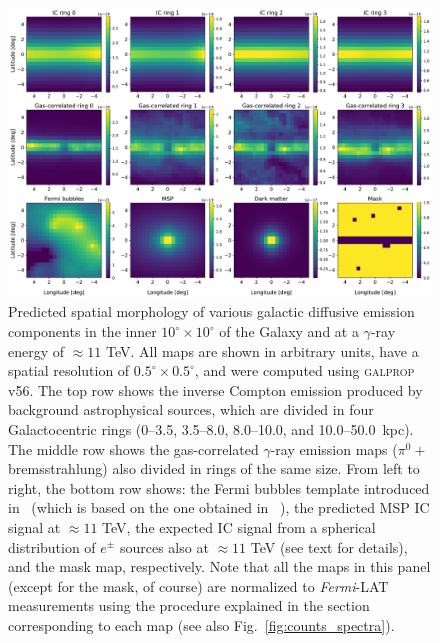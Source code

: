 \documentclass[doublespace,draft,nopageskip]{VTthesis} %
\begin{document}
\begin{figure}
    \begin{center}
    \includegraphics[scale = 0.45]{Figures/CTA/maps_orig.pdf}
    \caption{Predicted spatial morphology of various galactic diffusive emission components in the inner $10^\circ \times 10^\circ$ of the Galaxy and at a $\gamma$-ray energy of $\approx 11$ TeV. All maps  
    are shown in arbitrary units, have a spatial resolution of $0.5^\circ \times 0.5^\circ$, and were computed using \textsc{galprop} v56. The top row shows the inverse Compton emission produced by background astrophysical sources, which are divided in four Galactocentric rings (0--3.5, 3.5--8.0, 8.0--10.0, and 10.0--50.0~kpc). The middle row shows the gas-correlated $\gamma$-ray emission maps ($\pi^0+$bremsstrahlung) also divided in rings of the same size. From left to right, the bottom row shows: the Fermi bubbles template introduced in~\citet{Macias:2019omb} (which is based on the one obtained in ~\citet{Fermi-bubbles:2014sfa}), the predicted MSP IC signal at $\approx 11$ TeV, the expected IC signal from a spherical distribution of $e^{\pm}$ sources also at $\approx 11$ TeV 
    (see text for details), and the mask map, respectively. Note that all the maps in this panel (except for the mask, of course) are normalized to \textit{Fermi}-LAT measurements using the procedure explained in the section corresponding to each map (see also Fig.~\ref{fig:counts_spectra}).}
    \label{fig:galpropmaps}
    \end{center}
\end{figure}
\end{document}

